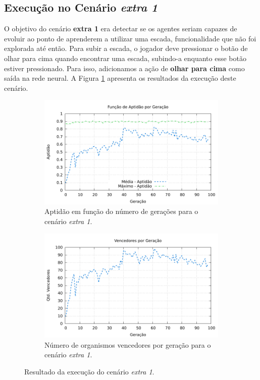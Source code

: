 \subsection{\label{section:experiment-extra1}Execução no Cenário \textit{extra
1}}

O objetivo do cenário \textbf{extra 1} era detectar se os agentes seriam capazes
de evoluir ao ponto de aprenderem a utilizar uma escada, funcionalidade que não
foi explorada até então. Para subir a escada, o jogador deve pressionar o botão
de olhar para cima quando encontrar uma escada, subindo-a enquanto esse botão
estiver pressionado. Para isso, adicionamos a ação de \textbf{olhar para cima}
como saída na rede neural. A Figura \ref{fig:extra1-results} apresenta os
resultados da execução deste cenário.

\begin{figure}[H]
\centering
	\begin{subfigure}[b]{0.45\textwidth}
        \includegraphics[width=\textwidth]{fig/extra1-fitness.pdf}
        \caption{Aptidão em função do número de gerações para o cenário
        \textit{extra 1}.}
	\end{subfigure}
	\begin{subfigure}[b]{0.45\textwidth}
        \includegraphics[width=\textwidth]{fig/extra1-winners.pdf}
        \caption{Número de organismos vencedores por geração para o cenário
        \textit{extra 1}.}
	\end{subfigure}

    \caption{Resultado da execução do cenário \textit{extra 1}.}
	\label{fig:extra1-results}
\end{figure}

